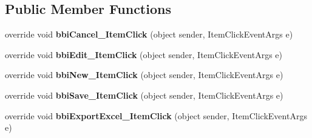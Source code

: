 \subsection*{Public Member Functions}
\begin{DoxyCompactItemize}
\item 
\mbox{\label{class_h_k_supply_1_1_forms_1_1_supply_1_1_supply_materials_1_1_purchase_order_materials_a42a4d1e62e0da8010eb3c751196632b8}} 
override void {\bfseries bbi\+Cancel\+\_\+\+Item\+Click} (object sender, Item\+Click\+Event\+Args e)
\item 
\mbox{\label{class_h_k_supply_1_1_forms_1_1_supply_1_1_supply_materials_1_1_purchase_order_materials_ae693ac76bb0cce9fd082177cf18c1f07}} 
override void {\bfseries bbi\+Edit\+\_\+\+Item\+Click} (object sender, Item\+Click\+Event\+Args e)
\item 
\mbox{\label{class_h_k_supply_1_1_forms_1_1_supply_1_1_supply_materials_1_1_purchase_order_materials_a2627d9cd9e28ea10d791c00e725d5613}} 
override void {\bfseries bbi\+New\+\_\+\+Item\+Click} (object sender, Item\+Click\+Event\+Args e)
\item 
\mbox{\label{class_h_k_supply_1_1_forms_1_1_supply_1_1_supply_materials_1_1_purchase_order_materials_ab2a7a5d480f9af2bb5eb5aa701fd0bdd}} 
override void {\bfseries bbi\+Save\+\_\+\+Item\+Click} (object sender, Item\+Click\+Event\+Args e)
\item 
\mbox{\label{class_h_k_supply_1_1_forms_1_1_supply_1_1_supply_materials_1_1_purchase_order_materials_a00f9157657df5151e9daafef6b8cac3a}} 
override void {\bfseries bbi\+Export\+Excel\+\_\+\+Item\+Click} (object sender, Item\+Click\+Event\+Args e)
\item 
\mbox{\label{class_h_k_supply_1_1_forms_1_1_supply_1_1_supply_materials_1_1_purchase_order_materials_ac52b0ff3382dc2c054b99cd3f56cdd42}} 

\end{DoxyCompactItemize}
